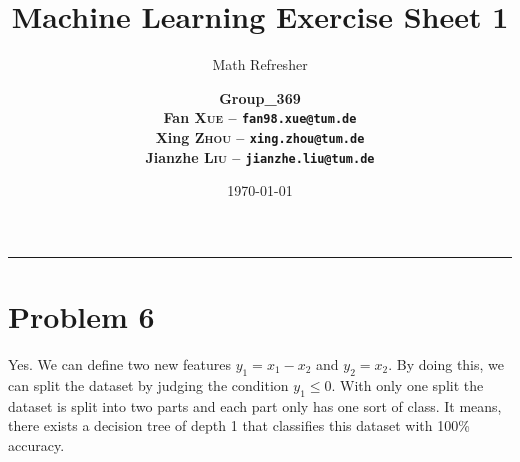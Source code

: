 \documentclass[12pt]{scrartcl}
\title{\large Machine Learning Exercise Sheet 1}
\subtitle{\Large Math Refresher}
\author{\large\bfseries Group\_369 \\
        \large Fan \textsc{Xue} -- \texttt{fan98.xue@tum.de} \\
        \large Xing \textsc{Zhou} -- \texttt{xing.zhou@tum.de} \\
        \large Jianzhe \textsc{Liu} -- \texttt{jianzhe.liu@tum.de}}
\date{\large \today}
\begin{document}
  \maketitle
  \vspace{-1cm}
  \noindent\rule{\textwidth}{0.4pt}

  \section*{Problem 6}

  Yes. We can define two new features $y_1 = x_1 - x_2$ and $y_2 = x_2$. By doing 
  this, we can split the dataset by judging the condition $y_1 \leqslant 0$. With
  only one split the dataset is split into two parts and each part only has one sort
  of class. It means, there exists a decision tree of depth 1 that classifies this 
  dataset with 100\% accuracy.

  
\end{document}
